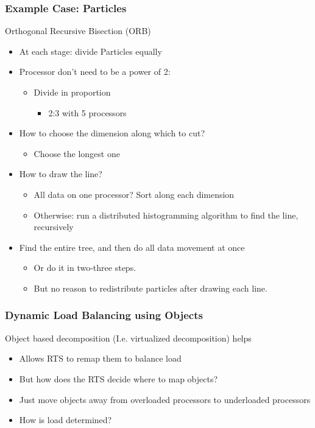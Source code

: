 \begin{frame}[fragile]
\frametitle{Example Case: Particles}
 Orthogonal Recursive Bisection (ORB)
 \begin{itemize} 
  \item At each stage: divide Particles equally
  \item Processor don’t need to be a power of 2:
  \begin{itemize} 
   \item Divide in proportion 
   \begin{itemize} 
    \item 2:3 with 5 processors
   \end{itemize}
  \end{itemize}
 \item How to choose the dimension along which to cut?
 \begin{itemize} 
  \item Choose the longest one
 \end{itemize}
 \item How to draw the line?
 \begin{itemize} 
  \item All data on one processor? Sort along each dimension
  \item Otherwise: run a distributed histogramming algorithm to find the line, recursively
 \end{itemize}
 \item Find the entire tree, and then do all data movement at once
 \begin{itemize} 
  \item Or do it in two-three steps.
  \item But no reason to redistribute particles after drawing each line.
 \end{itemize}
\end{itemize}
\end{frame}

\begin{frame}[fragile]
\frametitle{Dynamic Load Balancing using Objects}

Object based decomposition (I.e. virtualized decomposition) helps
\begin{itemize}
 \item Allows RTS to remap them to balance load
 \item But how does the RTS decide where to map objects?
 \item Just move objects away from overloaded processors to underloaded processors
 \item How is load determined?
\end{itemize}
\end{frame}

